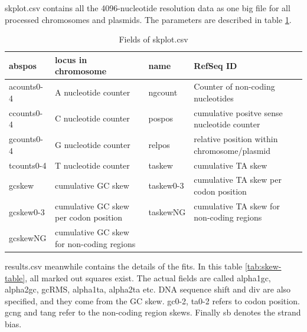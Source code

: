 \documentclass[fleqn,10pt]{wlscirep}
\begin{document}
skplot.csv contains all the 4096-nucleotide resolution data as one big file for all processed chromosomes and plasmids. The parameters are described in table \ref{tab:skplot}.
\begin{table}[ht]
\begin{tabular}{|l|l|l|l|}
\hline
abspos     & locus in chromosome                       & name      & RefSeq ID                                   \\ \hline
acounts0-4 & A nucleotide counter                      & ngcount   & Counter of non-coding nucleotides           \\ \hline
ccounts0-4 & C nucleotide counter                      & pospos    & cumulative positve sense nucleotide counter \\ \hline
gcounts0-4 & G nucleotide counter                      & relpos    & relative position within chromosome/plasmid \\ \hline
tcounts0-4 & T nucleotide counter                      & taskew    & cumulative TA skew                          \\ \hline
gcskew     & cumulative GC skew                        & taskew0-3 & cumulative TA skew per codon position       \\ \hline
gcskew0-3  & cumulative GC skew per codon position     & taskewNG  & cumulative TA skew for non-coding regions   \\ \hline
gcskewNG   & cumulative GC skew for non-coding regions &           &                                             \\ \hline
\end{tabular}
\caption{Fields of skplot.csv}
\label{tab:skplot}
\end{table}

results.csv meanwhile contains the details of the fits. In this table \ref{tab:skew-table}, all marked out squares exist. The actual fields
are called alpha1gc, alpha2gc, gcRMS, alpha1ta, alpha2ta etc. DNA sequence shift and div are also specified, and they come from the GC skew.
gc0-2, ta0-2 refers to codon position. gcng and tang refer to the non-coding region skews. Finally sb denotes the strand bias. 
\end{document}
